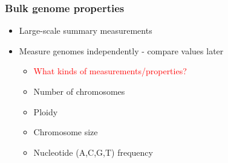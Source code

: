 %
\begin{frame}
  \frametitle{Bulk genome properties}
    \begin{itemize}
      \item Large-scale summary measurements
      \item Measure genomes independently - compare values later
        \begin{itemize}
         \item<2-2> \textcolor{red}{What kinds of measurements/properties?}
         \item<3-> \textcolor{hutton_green}{Number of chromosomes}
         \item<3-> \textcolor{hutton_blue}{Ploidy}
         \item<3-> \textcolor{RawSienna}{Chromosome size}
         \item<3-> \textcolor{hutton_purple}{Nucleotide (A,C,G,T) frequency}        
        \end{itemize}
    \end{itemize}
\end{frame}

